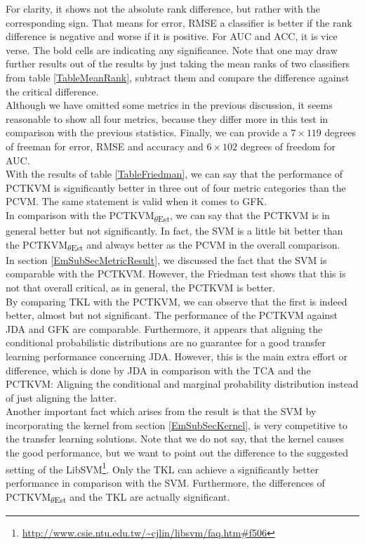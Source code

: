For clarity, it shows not the absolute rank difference, but rather with the corresponding sign.
That means for error, \acs{RMSE} a classifier is better if the rank difference is negative and worse if it is positive.
For \acs{AUC} and \acs{ACC}, it is vice verse.
The bold cells are indicating any significance.
Note that one may draw further results out of the results by just taking the mean ranks of two classifiers from table \ref{TableMeanRank}, subtract them and compare the difference against the critical difference. \\
Although we have omitted some metrics in the previous discussion, it seems reasonable to show all four metrics, because they differ more in this test in comparison with the previous statistics.
Finally, we can provide a $7\times 119$ degrees of freeman for error, \acs{RMSE} and accuracy and $6\times102$ degrees of freedom for \acs{AUC}.\\
With the results of table \ref{TableFriedman}, we can say that the performance of \acs{PCTKVM} is significantly better in three out of four metric categories than the \acs{PCVM}. The same statement is valid when it comes to \acs{GFK}.\\
In comparison with the \acs{PCTKVM}\textsubscript{$\theta$Est}, we can say that the \acs{PCTKVM} is in general better but not significantly.
In fact, the \acs{SVM} is a little bit better than the \acs{PCTKVM}\textsubscript{$\theta$Est} and always better as the \acs{PCVM} in the overall comparison.\\
In section \ref{EmSubSecMetricResult}, we discussed the fact that the \acs{SVM} is comparable with the \acs{PCTKVM}. However, the Friedman test shows that this is not that overall critical, as in general, the \acs{PCTKVM} is better.\\
By comparing \acs{TKL} with the \acs{PCTKVM}, we can observe that the first is indeed better, almost but not significant.
The performance of the \acs{PCTKVM} against \acs{JDA} and \acs{GFK} are comparable.
Furthermore, it appears that aligning the conditional probabilistic distributions are no guarantee for a good transfer learning performance concerning \acs{JDA}. However, this is the main extra effort or difference, which is done by \acs{JDA} in comparison with the \acs{TCA} and the \acs{PCTKVM}: Aligning the conditional and marginal probability distribution instead of just aligning the latter.\cite{Long.}\cite{Pan.2011}\cite{Long.2015}\\
Another important fact which arises from the result is that the \acs{SVM} by incorporating the kernel from section \ref{EmSubSecKernel}, is very competitive to the transfer learning solutions.
Note that we do not say, that the kernel causes the good performance, but we want to point out the difference to the suggested setting of the LibSVM\footnote{\url{http://www.csie.ntu.edu.tw/~cjlin/libsvm/faq.htm\#f506}}.
Only the \acs{TKL} can achieve a significantly better performance in comparison with the \acs{SVM}.
Furthermore, the differences of \acs{PCTKVM}\textsubscript{$\theta$Est} and the \acs{TKL} are actually significant. 
\FloatBarrier
